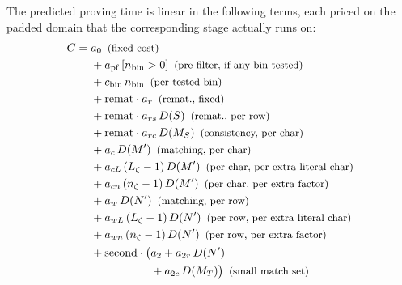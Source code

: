  The predicted proving time is linear in the following terms, each priced on the padded domain that the corresponding stage actually runs on:
\ifsp
\newcommand{\cmnote}[1]{\enspace\text{\small(#1)}}
\begin{align*}
  C = {}& a_0 \cmnote{fixed cost} \\
  &+ a_{\mathrm{pf}}\, [n_{\mathrm{bin}} > 0] \cmnote{pre-filter, if any bin tested} \\
  &+ c_{\mathrm{bin}}\, n_{\mathrm{bin}} \cmnote{per tested bin} \\
  &+ \mathrm{remat} \cdot a_r \cmnote{remat., fixed} \\
  &+ \mathrm{remat} \cdot a_{rs}\, D(S) \cmnote{remat., per row} \\
  &+ \mathrm{remat} \cdot a_{rc}\, D(M_S) \cmnote{consistency, per char} \\
  &+ a_c\, D(M') \cmnote{matching, per char} \\
  &+ a_{cL}\, (L_\zeta - 1)\, D(M') \cmnote{per char, per extra literal char} \\
  &+ a_{cn}\, (n_\zeta - 1)\, D(M') \cmnote{per char, per extra factor} \\
  &+ a_w\, D(N') \cmnote{matching, per row} \\
  &+ a_{wL}\, (L_\zeta - 1)\, D(N') \cmnote{per row, per extra literal char} \\
  &+ a_{wn}\, (n_\zeta - 1)\, D(N') \cmnote{per row, per extra factor} \\
  &+ \mathrm{second} \cdot \bigl(a_2 + a_{2r}\, D(N') \\
  &\phantom{{}+ \mathrm{second} \cdot \bigl(}{} + a_{2c}\, D(M_T)\bigr) \cmnote{small match set}
\end{align*}
\else
